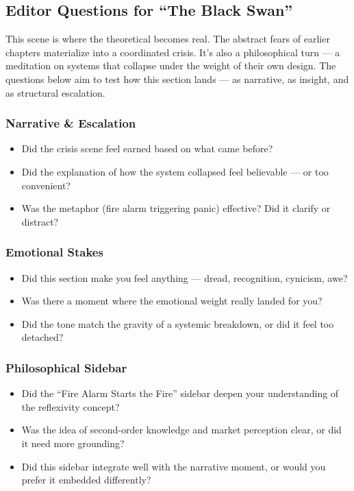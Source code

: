 \subsection{Editor Questions for ``The Black Swan''}

This scene is where the theoretical becomes real. The abstract fears of earlier chapters materialize into a coordinated crisis. 
It’s also a philosophical turn — a meditation on systems that collapse under the weight of their own design. The questions 
below aim to test how this section lands — as narrative, as insight, and as structural escalation.

\subsubsection{Narrative \& Escalation}

\begin{itemize}
  \item Did the crisis scene feel earned based on what came before?
  \item Did the explanation of how the system collapsed feel believable — or too convenient?
  \item Was the metaphor (fire alarm triggering panic) effective? Did it clarify or distract?
\end{itemize}

\subsubsection{Emotional Stakes}

\begin{itemize}
  \item Did this section make you feel anything — dread, recognition, cynicism, awe?
  \item Was there a moment where the emotional weight really landed for you?
  \item Did the tone match the gravity of a systemic breakdown, or did it feel too detached?
\end{itemize}

\subsubsection{Philosophical Sidebar}

\begin{itemize}
  \item Did the “Fire Alarm Starts the Fire” sidebar deepen your understanding of the reflexivity concept?
  \item Was the idea of second-order knowledge and market perception clear, or did it need more grounding?
  \item Did this sidebar integrate well with the narrative moment, or would you prefer it embedded differently?
\end{itemize}

